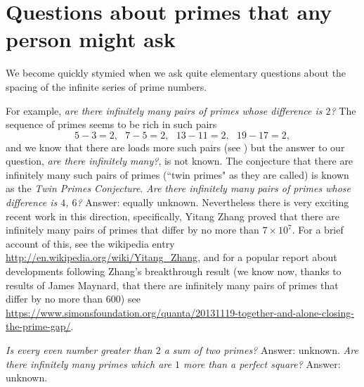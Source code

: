 \documentclass[openany]{book}
\theoremstyle{plain}
\theoremstyle{definition}
\begin{document}
%

%


\chapter[Questions about primes]{Questions about primes that any person might ask}

We become quickly stymied when we ask quite elementary questions about
the spacing of the infinite series of prime numbers.

For example, {\em are there infinitely many pairs of primes whose
  difference is $2$?}  The sequence of primes seems to be rich in such
pairs $$5-3 =2,\ \ \ 7-5=2,\ \ \ 13-11=2,\ \ \ 19-17 =2,$$ and we know
that there are loads more such pairs (see ) but the answer to our question,
{\em are there infinitely many?}, is not known. The conjecture that there are infinitely many such pairs of primes (``twin primes" as they are called) is known as the {\it Twin Primes Conjecture}.
{\em Are there
  infinitely many pairs of primes whose difference is $4$, $6$?}  Answer:
equally unknown.
Nevertheless there is very exciting recent work in this direction, specifically,
Yitang Zhang proved that there are infinitely many pairs of primes that differ
by no more than $7\times 10^7$. For a brief account of this, see the wikipedia entry \url{http://en.wikipedia.org/wiki/Yitang_Zhang}, and for a popular report  about developments following Zhang's breakthrough result (we know now, thanks to results of James Maynard, that there are infinitely many pairs of primes that differ
by no more than $600$) see \url{https://www.simonsfoundation.org/quanta/20131119-together-and-alone-closing-the-prime-gap/}.

{\em Is every even number greater than $2$ a sum of
  two primes?}  Answer: unknown. {\em Are there infinitely many primes
  which are $1$ more than a perfect square?}  Answer: unknown.
\end{document}
